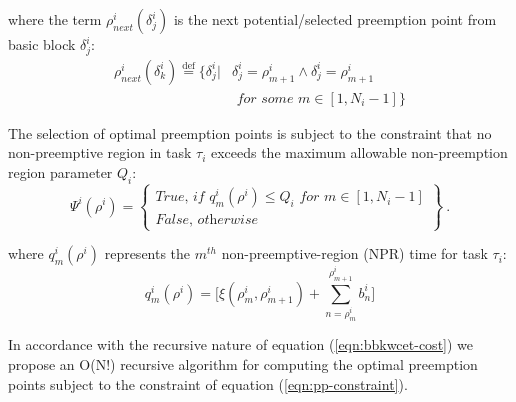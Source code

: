 \noindent
where the term \begin{math}\rho_{next}^{i}(\delta_{j}^{i})\end{math} is the next potential/selected preemption point from basic block \begin{math}\delta_{j}^{i}\end{math}:
\begin{equation}\label{eqn:ppnext-set}
\begin{split}
   \rho_{next}^{i}(\delta_{k}^{i}) \stackrel{\text{def}}{=} \{\delta_{j}^{i}|&\delta_{j}^{i} = \rho_{m+1}^{i} \wedge \delta_{j}^{i} = \rho_{m+1}^{i} \\ &\textit{ for some m} \in [1,N_{i}-1]\}
\end{split}
\end{equation}

\noindent
The selection of optimal preemption points is subject to the constraint that no non-preemptive region in task \begin{math}\tau_{i}\end{math} exceeds the maximum allowable non-preemption region parameter \begin{math}Q_{i}\end{math}:
\begin{equation}\label{eqn:pp-constraint}
   \Psi^{i}(\rho^{i}) =
\left\{
\begin{array}{l}
    \textit{True, if } q_{m}^{i}(\rho^{i}) \leq Q_{i} \textit{ for } m \in [1,N_{i}-1] \\
    \textit{False, otherwise}
\end{array}
\right\}~.
\end{equation}

\noindent
where \begin{math}q_{m}^{i}(\rho^{i})\end{math} represents the \begin{math}m^{th}\end{math} non-preemptive-region (NPR) time for task \begin{math}\tau_{i}\end{math}:
\begin{equation}\label{eqn:mthnpr-time}
   q_{m}^{i}(\rho^{i}) = \Big[\xi(\rho_{m}^{i},\rho_{m+1}^{i}) + \sum_{n=\rho_{m}^{i}}^{\rho_{m+1}^{i}}b_{n}^{i}\Big]
\end{equation}

\noindent
In accordance with the recursive nature of equation (\ref{eqn:bbkwcet-cost}) we propose an O(N!) recursive algorithm for computing the optimal preemption points subject to the constraint of equation (\ref{eqn:pp-constraint}).

